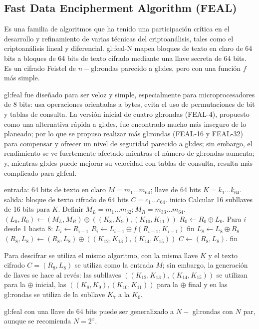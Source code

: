 \subsection{Fast Data Encipherment Algorithm (FEAL)}

Es una familia de algoritmos que ha tenido una participación crítica
en el desarrollo y refinamiento de varias técnicas del criptoanálisis,
tales como el criptoanálisis lineal y diferencial. \acrshort{gl:feal}-N mapea
bloques de texto en claro de 64 bits a bloques de 64 bits de texto
cifrado mediante una llave secreta de 64 bits. Es un cifrado Feistel de
$n-$\glspl{gl:ronda} parecido a \acrshort{gl:des}, pero con una función $f$ más
simple.

\acrshort{gl:feal} fue diseñado para ser veloz y simple, especialmente para
microprocesadores de 8 bits: usa operaciones orientadas a bytes, evita
el uso de permutaciones de bit y tablas de consulta. La versión inicial
de cuatro \glspl{gl:ronda} (FEAL-4), propuesto como una alternativa rápida a
\acrshort{gl:des}, fue encontrado mucho más inseguro de lo planeado; por lo
que se propuso realizar más \glspl{gl:ronda} (FEAL-16 y FEAL-32) para compensar
y ofrecer un nivel de seguridad parecido a \acrshort{gl:des}; sin embargo, el
rendimiento se ve fuertemente afectado mientras el número de \glspl{gl:ronda}
aumenta; y, mientras \acrshort{gl:des} puede mejorar su velocidad con tablas de
consulta, resulta más complicado para \acrshort{gl:feal}.

\begin{pseudocodigo}[caption={FEAL-8, cifrado.}, label={feal8:1}]
  entrada:    64 bits de texto en claro $M = m_1 \dots m_{64}$;
              llave de 64 bits $K = k_1 \dots k_{64}$.
  salida:     bloque de texto cifrado de 64 bits $C = c_1 \dots c_{64}$.
  inicio
    Calcular 16 subllaves de 16 bits para $K$.
    Definir $M_L = m_1 \dots m_{32}; M_R = m_{33} \dots m_{64}$.
    $(L_0, R_0) \leftarrow (M_L, M_R) \oplus ((K_8, K_9), (K_{10}, K_{11}))$
    $R_0 \leftarrow R_0 \oplus L_0$.
    Para $i$ desde 1 hasta 8:
      $L_i \leftarrow R_{i-1}$
      $R_i \leftarrow L_{i-1} \oplus f(R_{i-1}, K_{i-1})$
    fin
    $L_8 \leftarrow L_8 \oplus R_8$
    $(R_8, L_8) \leftarrow (R_8, L_8) \oplus ((K_{12}, K_{13}),(K_{14},K_{15}))$
    $C \leftarrow (R_8, L_8)$.
  fin
\end{pseudocodigo}


Para descifrar se utiliza el mismo algoritmo, con la misma llave $K$ y el
texto cifrado $C = (R_8, L_8)$ se utiliza como la entrada $M$; sin
embargo, la generación de llaves se hace al revés: las subllaves
$((K_{12}, K_{13}), (K_{14}, K_{15}))$ se utilizan para la $\oplus$ inicial,
las $((K_8, K_9), (K_{10}, K_{11}))$ para la $\oplus$ final y en las
\glspl{gl:ronda} se utiliza de la subllave $K_7$ a la $K_0$.

\acrshort{gl:feal} con una llave de 64 bits puede ser generalizado a $N-$
\glspl{gl:ronda} con $N$ par, aunque se recomienda $N = 2^x$.
